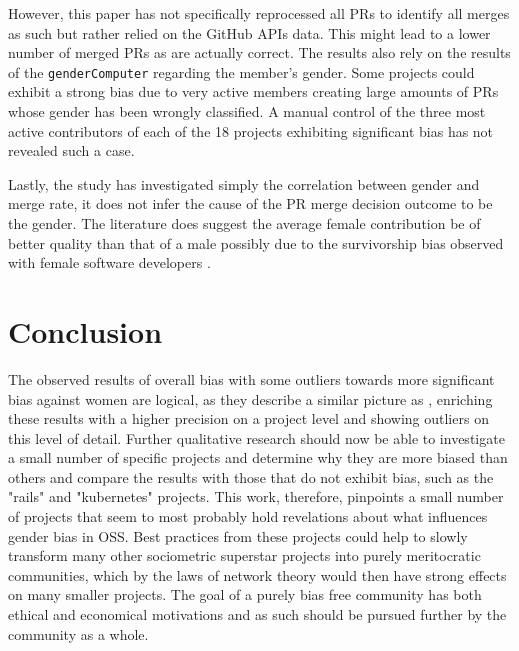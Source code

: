 However, this paper has not specifically reprocessed all \ac{PR}s to identify all merges as such but rather relied on the GitHub \ac{API}s data. This might lead to a lower number of merged \ac{PR}s as are actually correct. The results also rely on the results of the \lstinline|genderComputer| regarding the member's gender. Some projects could exhibit a strong bias due to very active members creating large amounts of \ac{PR}s whose gender has been wrongly classified. A manual control of the three most active contributors of each of the 18 projects exhibiting significant bias has not revealed such a case.

Lastly, the study has investigated simply the correlation between gender and merge rate, it does not infer the cause of the \ac{PR} merge decision outcome to be the gender. The literature does suggest the average female contribution be of better quality than that of a male possibly due to the survivorship bias observed with female software developers \cite{genderdiff:2016}.


\section{Conclusion}\label{Conclusion}

The observed results of overall bias with some outliers towards more significant bias against women are logical, as they describe a similar picture as \cite{genderdiff:2016}, enriching these results with a higher precision on a project level and showing outliers on this level of detail. Further qualitative research should now be able to investigate a small number of specific projects and determine why they are more biased than others and compare the results with those that do not exhibit bias, such as the "rails" and "kubernetes" projects. This work, therefore, pinpoints a small number of projects that seem to most probably hold revelations about what influences gender bias in \ac{OSS}. Best practices from these projects could help to slowly transform many other sociometric superstar projects into purely meritocratic communities, which by the laws of network theory would then have strong effects on many smaller projects. The goal of a purely bias free community has both ethical and economical motivations and as such should be pursued further by the community as a whole.












